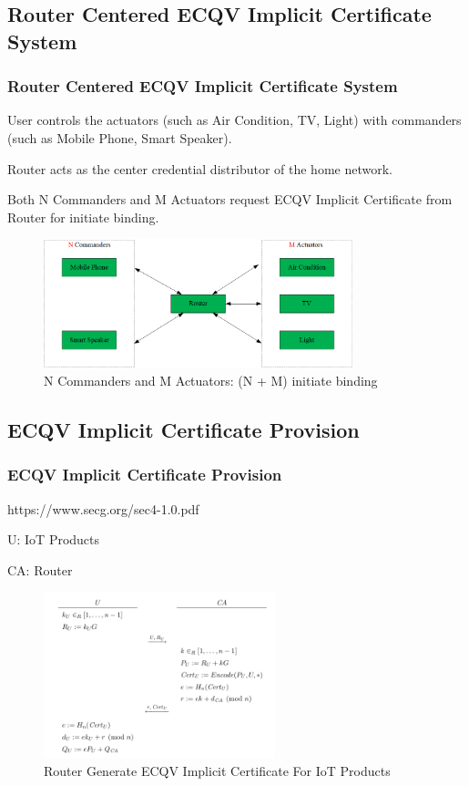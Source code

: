 \documentclass{ctexbeamer}
\begin{document}
\subsection{Router Centered ECQV Implicit Certificate System}
\begin{frame}
\frametitle{Router Centered ECQV Implicit Certificate System}

User controls the actuators (such as Air Condition, TV, Light) with commanders (such as Mobile Phone, Smart Speaker).

Router acts as the center credential distributor of the home network.

Both N Commanders and M Actuators request ECQV Implicit Certificate from Router for initiate binding.

    \begin{figure}[H]
        \centering 
        \includegraphics[width=0.8\textwidth]{pic/ecqv.png} 
        \caption{N Commanders and M Actuators: (N + M) initiate binding} 
        \label{fig.ecqv}
    \end{figure}

\end{frame}

\subsection{ECQV Implicit Certificate Provision}
\begin{frame}
\frametitle{ECQV Implicit Certificate Provision}

https://www.secg.org/sec4-1.0.pdf

    U:  IoT Products

    CA: Router

    \begin{figure}[H]
        \centering 
        \includegraphics[width=0.6\textwidth]{pic/ecqv_provision.png} 
        \caption{Router Generate ECQV Implicit Certificate For IoT Products} 
        \label{fig.ecqv.provision}
    \end{figure}

\end{frame}
\end{document}
